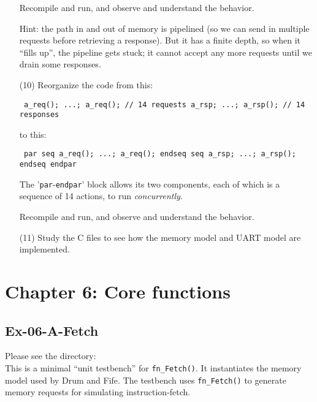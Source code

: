 \begin{itemize}
    Recompile and run, and observe and understand the behavior.

    Hint: the path in and out of memory is pipelined (so we can send
    in multiple requests before retrieving a response).  But it has a
    finite depth, so when it ``fills up'', the pipeline gets stuck; it
    cannot accept any more requests until we drain some responses.

\item[(10)] Reorganize the code from this:

    \begin{tabbing}\footnotesize\tt
    a\_req(); ...; a\_req();    // 14 requests
    a\_rsp; ...; a\_rsp();      // 14 responses
    \end{tabbing}

    to this:

    \begin{tabbing}\footnotesize\tt
    par
       seq a\_req(); ...; a\_req(); endseq
       seq a\_rsp; ...; a\_rsp();   endseq
    endpar
    \end{tabbing}

    The '\verb|par|-\verb|endpar|' block allows its two components,
    each of which is a sequence of 14 actions, to run \emph{concurrently}.

    Recompile and run, and observe and understand the behavior.

\item[(11)] Study the C files to see how the memory model and UART
    model are implemented.

\end{itemize}


\hdivider

\section*{Chapter 6: Core functions}


\subsection*{Ex-06-A-Fetch}
\label{Ex-06-A-Fetch}

Please see the directory:  \\
This is a minimal ``unit testbench'' for \verb|fn_Fetch()|.  It
instantiates the memory model used by Drum and Fife.  The testbench
uses \verb|fn_Fetch()| to generate memory requests for simulating
instruction-fetch.

